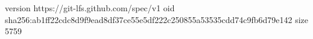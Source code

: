 version https://git-lfs.github.com/spec/v1
oid sha256:ab1ff22cdc8d9f9ead8df37ce55e5df222c250855a53535cdd74c9fb6d79e142
size 5759
